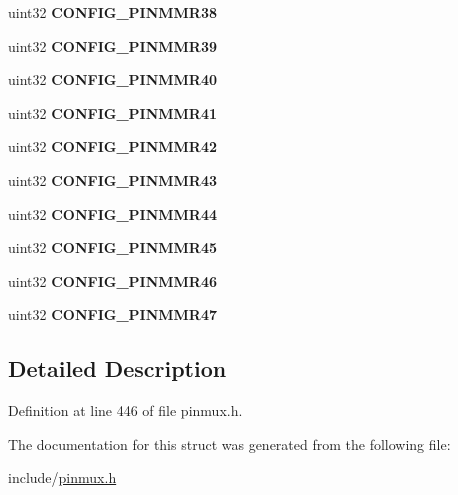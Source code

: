 \begin{DoxyCompactItemize}
uint32 {\bfseries C\+O\+N\+F\+I\+G\+\_\+\+P\+I\+N\+M\+M\+R38}
\item 
\mbox{\label{structpinmux__config__reg_a61745429f95cd581d9f9f4eacdc2a73f}} 
uint32 {\bfseries C\+O\+N\+F\+I\+G\+\_\+\+P\+I\+N\+M\+M\+R39}
\item 
\mbox{\label{structpinmux__config__reg_a96987dadcc1c89d375ee7ccaef7ed25f}} 
uint32 {\bfseries C\+O\+N\+F\+I\+G\+\_\+\+P\+I\+N\+M\+M\+R40}
\item 
\mbox{\label{structpinmux__config__reg_ad8d941030d9ec89ded684bbd05030a63}} 
uint32 {\bfseries C\+O\+N\+F\+I\+G\+\_\+\+P\+I\+N\+M\+M\+R41}
\item 
\mbox{\label{structpinmux__config__reg_a7022ae7430cd813010b2797f72bca6bb}} 
uint32 {\bfseries C\+O\+N\+F\+I\+G\+\_\+\+P\+I\+N\+M\+M\+R42}
\item 
\mbox{\label{structpinmux__config__reg_a1955e0559bb958962e557f8188044ddc}} 
uint32 {\bfseries C\+O\+N\+F\+I\+G\+\_\+\+P\+I\+N\+M\+M\+R43}
\item 
\mbox{\label{structpinmux__config__reg_a7cc4fae4dac25eafcc3ae8390c608249}} 
uint32 {\bfseries C\+O\+N\+F\+I\+G\+\_\+\+P\+I\+N\+M\+M\+R44}
\item 
\mbox{\label{structpinmux__config__reg_a00f13af4ec31ba0dde2cb64a8279cfe4}} 
uint32 {\bfseries C\+O\+N\+F\+I\+G\+\_\+\+P\+I\+N\+M\+M\+R45}
\item 
\mbox{\label{structpinmux__config__reg_ae04a9ab7811f46a6c9bf814d524e4722}} 
uint32 {\bfseries C\+O\+N\+F\+I\+G\+\_\+\+P\+I\+N\+M\+M\+R46}
\item 
\mbox{\label{structpinmux__config__reg_a1ae94f8d2d07dd66ecbb78d2f1e5f131}} 
uint32 {\bfseries C\+O\+N\+F\+I\+G\+\_\+\+P\+I\+N\+M\+M\+R47}
\end{DoxyCompactItemize}


\subsection{Detailed Description}


Definition at line 446 of file pinmux.\+h.



The documentation for this struct was generated from the following file\+:\begin{DoxyCompactItemize}
\item 
include/\mbox{\hyperlink{pinmux_8h}{pinmux.\+h}}\end{DoxyCompactItemize}
